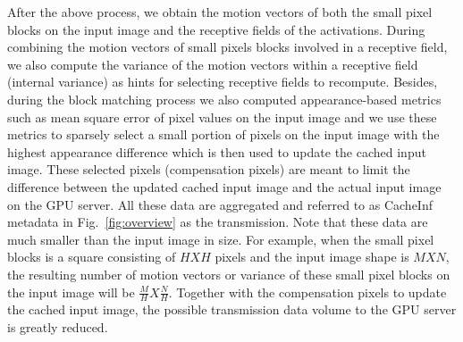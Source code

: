 After the above process, we obtain the motion vectors of both the small pixel blocks on the input image and the receptive fields of the activations.
During combining the motion vectors of small pixels blocks involved in a receptive field, we also compute the variance of the motion vectors within a receptive field (internal variance) as hints for selecting receptive fields to recompute.
Besides, during the block matching process we also computed appearance-based metrics such as mean square error of pixel values on the input image and we use these metrics to sparsely select a small portion of pixels on the input image with the highest appearance difference which is then used to update the cached input image.
These selected pixels (compensation pixels) are meant to limit the difference between the updated cached input image and the actual input image on the GPU server.
All these data are aggregated and referred to as CacheInf metadata in Fig.~\ref{fig:overview} as the transmission.
Note that these data are much smaller than the input image in size. 
For example, when the small pixel blocks is a square consisting of $HXH$ pixels and the input image shape is $MXN$, the resulting number of motion vectors or variance of these small pixel blocks on the input image will be $\frac{M}{H}X\frac{N}{H}$.
Together with the compensation pixels to update the cached input image, the possible transmission data volume to the GPU server is greatly reduced.


